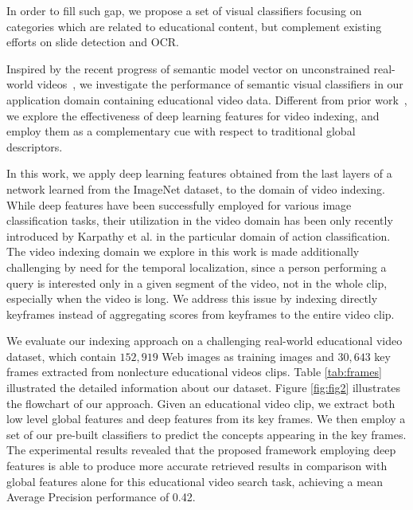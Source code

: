 \documentclass[11pt,twocolumn,twoside]{IEEEtran}
\begin{document}
In order to fill such gap, we propose a set of visual classifiers focusing on categories which are related to educational content, but complement existing efforts on slide detection and OCR.



Inspired by the recent progress of semantic model vector on unconstrained real-world videos~\cite{Michele_TMM13}\cite{Boostroost}, we
investigate the performance of semantic visual classifiers in our application domain containing educational video data. Different from prior work~\cite{ICME03}\cite{ICME06}\cite{IMARS}, we explore the effectiveness of deep learning features for video indexing, and employ them as a complementary cue with respect to traditional global descriptors.


In this work, we apply deep learning features obtained from the last layers of a network learned from the ImageNet dataset, to the domain of video indexing. While deep features have been successfully employed for various image classification tasks, their utilization in the video domain has been only recently introduced by Karpathy et al. \cite{Karpathy_CVPR14} in the particular domain of action classification.
 The video indexing domain we explore in this work is made additionally challenging  by need for the temporal localization, since a person performing a query is interested only in a given segment of the video, not in the whole clip, especially when the video is long. We address this issue by indexing directly keyframes instead of aggregating scores from keyframes to the entire video clip.

 We evaluate our indexing approach on a challenging real-world educational video dataset,
which contain $152,919$ Web images as training images and $30,643$ key frames extracted from nonlecture educational videos clips.   Table \ref{tab:frames} illustrated the detailed information about our dataset.
Figure \ref{fig:fig2} illustrates the flowchart of our approach. Given an educational video clip, we extract both low level global features and deep features from its key frames. We then employ a set of our pre-built classifiers to predict the concepts appearing in the key frames. The experimental results revealed that the proposed framework employing deep features is able to produce more accurate retrieved results in comparison with global features alone for this educational video search task, achieving a mean Average Precision performance of 0.42.
\end{document}
